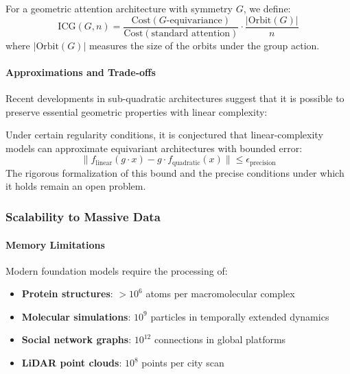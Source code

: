 \begin{definition}
For a geometric attention architecture with symmetry $G$, we define:
\begin{equation}
\text{ICG}(G, n) = \frac{\text{Cost}(G\text{-equivariance})}{\text{Cost}(\text{standard attention})} \cdot \frac{|\text{Orbit}(G)|}{n}
\label{eq:geometric_complexity_index}
\end{equation}
where $|\text{Orbit}(G)|$ measures the size of the orbits under the group action.
\end{definition}

\paragraph{Approximations and Trade-offs}

Recent developments in sub-quadratic architectures suggest that it is possible to preserve essential geometric properties with linear complexity:

\begin{remark}
Under certain regularity conditions, it is conjectured that linear-complexity models can approximate equivariant architectures with bounded error:
\begin{equation}
\|f_{\text{linear}}(g \cdot x) - g \cdot f_{\text{quadratic}}(x)\| \leq \epsilon_{\text{precision}}
\label{eq:linear_equivariance_approximation}
\end{equation}
The rigorous formalization of this bound and the precise conditions under which it holds remain an open problem.
\end{remark}

\subsubsection{Scalability to Massive Data}

\paragraph{Memory Limitations}

Modern foundation models require the processing of:
\begin{itemize}
    \item \textbf{Protein structures}: $>10^6$ atoms per macromolecular complex
    \item \textbf{Molecular simulations}: $10^9$ particles in temporally extended dynamics
    \item \textbf{Social network graphs}: $10^{12}$ connections in global platforms
    \item \textbf{LiDAR point clouds}: $10^8$ points per city scan
\end{itemize}

